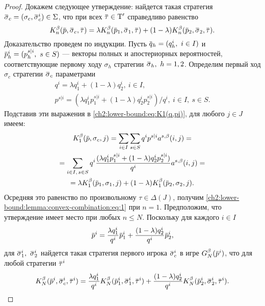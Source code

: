 {\begin{proof}
  Докажем следующее утверждение: найдется такая стратегия $\sigmav_c = (\sigma_c, \sigmav_c^i) \in \Sigma$, что при всех $\tauv \in \Tau'$ справедливо равенство
  \begin{equation}
    \label{ch2:lower-bound:lemma:convex-combination:eq:1}
    \K[n](\p, \sigmav_c, \tauv) =
    \lambda \K[n](\p_1, \sigmav_1, \tauv) +
    (1-\lambda)\K[n](\p_2, \sigmav_2, \tauv).
  \end{equation}
  Доказательство проведем по индукции.
  Пусть $\q_h = (q_h^i,\ i \in I)$ и $\p_h^i = (p_h^{s|i},\ s \in S)$ --- векторы полных и апостериорных вероятностей, соответствующие первому ходу $\sigma_h$ стратегии $\sigmav_h,\ h = 1, 2$.
  Определим первый ход $\sigma_c$ стратегии $\sigmav_c$ параметрами
  \begin{equation*}
    \begin{gathered}
      q^i = \lambda q^i_1 + (1-\lambda) q^i_2,\ i \in I,                               \\
      p^{s|i} = \left(
        \lambda q^i_1 p^{s|i}_1 + (1-\lambda) q^i_2 p^{s|i}_2
      \right) / q^i,\ i \in I,\ s \in S.
    \end{gathered}
  \end{equation*}
  Подставив эти выражения в \eqref{ch2:lower-bound:eq:K1(q,pi)}, для любого $j \in J$ имеем:
  \begin{multline*}
    \K[1](\p, \sigma_c, j) =
    \sum_{i \in I}\sum_{s \in S} q^i p^{s|i} \as(i, j) =                               \\
    = \sum_{i \in I, \, s \in S}
    q^i \frac{(\lambda q^i_1 p^{s|i}_1 + (1-\lambda) q^i_2 p^{s|i}_2)}{q^i} \as(i,j) = \\
    = \lambda \K[1](\p_1, \sigma_1, j) +
    (1-\lambda)\K[1](\p_2, \sigma_2, j).
  \end{multline*}
  Осредняя это равенство по произвольному $\tau \in \Delta(J)$, получим \eqref{ch2:lower-bound:lemma:convex-combination:eq:1} при $n = 1$.
  Предположим, что утверждение имеет место при любых $n \leqslant N$.
  Поскольку для каждого $i \in I$
  \[
    \p^i = \frac{\lambda q_1^i}{q^i} \p_1^i + \frac{(1-\lambda)q_2^i}{q^i} \p_2^i,
  \]
  для $\sigmav_1^i,\ \sigmav_2^i$ найдется такая стратегия первого игрока $\sigmav_c^i$ в игре $\theG[N](\p^i)$, что для любой стратегии $\tauv^i$
  \begin{equation*}
    \begin{gathered}
      \K[N](\p^i, \sigmav^i_c, \tauv^i) =
      \frac{\lambda q^i_1}{q^i} \K[N](\p^i_1, \sigmav^i_1, \tauv^i) +
      \frac{(1-\lambda) q^i_2}{q^i} \K[N](\p^i_2, \sigmav^i_2, \tauv^i).

\end{gathered}
\end{equation*}
\end{proof}}

